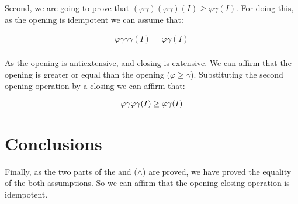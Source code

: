 \documentclass{article}
\begin{document}
Second, we are going to prove that $(\varphi \gamma)(\varphi \gamma) (I) \geq \varphi \gamma(I)$. For doing this, as the opening is idempotent we can assume that:

\begin{equation}
\begin{split}
    \varphi \gamma \gamma \gamma(I) = \varphi \gamma(I) \\
\end{split}
\end{equation}

As the opening is antiextensive, and closing is extensive. We can affirm that the opening is greater or equal than the opening ($\varphi \geq \gamma$). Substituting the second opening operation by a closing we can affirm that:

\begin{equation}
     \varphi \gamma \varphi \gamma(I) \geq \varphi \gamma(I) \\
\end{equation}

\section{Conclusions}

Finally, as the two parts of the and ($\land$) are proved, we have proved the equality of the both assumptions. So we can affirm that the opening-closing operation is idempotent.
\end{document}
